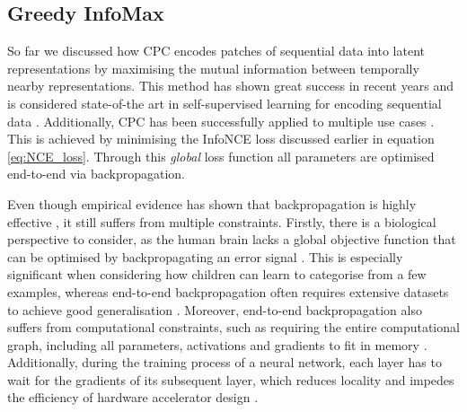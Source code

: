 \subsection{Greedy InfoMax}
	So far we discussed how CPC encodes patches of sequential data into latent representations by maximising the mutual information between temporally nearby representations. This method has shown great success in recent years and is considered state-of-the art in self-supervised learning for encoding sequential data \citep{stackeEvaluationContrastivePredictive2020}. Additionally, CPC has been successfully applied to multiple use cases \citep{stackeEvaluationContrastivePredictive2020, dehaanContrastivePredictiveCoding2021, luSemiSupervisedHistologyClassification2019, bhatiSegmentalContrastivePredictive2021b, deldariTimeSeriesChange2021, henaffDataEfficientImageRecognition2020}. This is achieved by minimising the InfoNCE loss discussed earlier in equation \ref{eq:NCE_loss}. Through this \textit{global} loss function all parameters are optimised end-to-end via backpropagation. 
	
	Even though empirical evidence has shown that backpropagation is highly effective \citep{NIPS2012_c399862d, ioffeBatchNormalizationAccelerating2015}, it still suffers from multiple constraints. Firstly, there is a biological perspective to consider, as the human brain lacks a global objective function that can be optimised by backpropagating an error signal \citep{marblestoneIntegrationDeepLearning2016}. This is especially significant when considering how children can learn to categorise from a few examples, whereas end-to-end backpropagation often requires extensive datasets to achieve good generalisation \citep{lowePuttingEndEndtoEnd2020}. Moreover, end-to-end backpropagation also suffers from computational constraints, such as requiring the entire computational graph, including all parameters, activations and gradients to fit in memory \citep{lowePuttingEndEndtoEnd2020}. Additionally, during the training process of a neural network, each layer has to wait for the gradients of its subsequent layer, which reduces locality and impedes the efficiency of hardware accelerator design \citep{lowePuttingEndEndtoEnd2020}.
		
		
	
